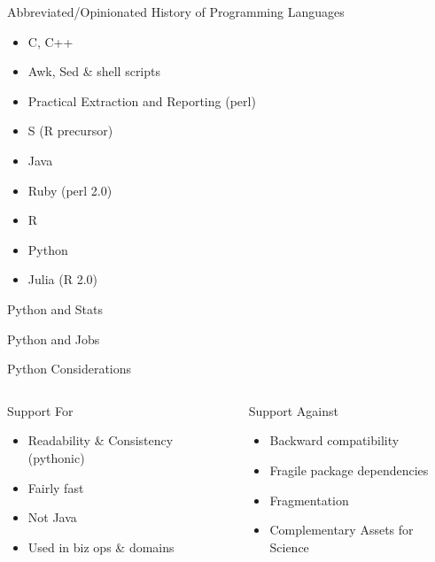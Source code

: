 \documentclass[presentation]{beamer}
\begin{document}
\begin{frame}[label=sec-2-0-1]{Abbreviated/Opinionated History of Programming Languages}
\begin{itemize}
\item C, C++
\item Awk, Sed \& shell scripts
\item Practical Extraction and Reporting (perl)
\item S (R precursor)
\item Java
\item Ruby (perl 2.0)
\item R
\item Python
\item Julia (R 2.0)
\end{itemize}
\end{frame}

\begin{frame}[label=sec-2-0-2]{Python and Stats}
\end{frame}

\begin{frame}[label=sec-2-0-3]{Python and Jobs}
\end{frame}

\begin{frame}[label=sec-2-0-4]{Python Considerations}
\begin{columns}
\begin{column}{0.4\textwidth}
\begin{block}{Support For}
\begin{itemize}
\item Readability \& Consistency (pythonic)
\item Fairly fast
\item Not Java
\item Used in biz ops \& domains
\end{itemize}
\end{block}
\end{column}

\begin{column}{0.4\textwidth}
\begin{block}{Support Against}
\begin{itemize}
\item Backward compatibility
\item Fragile package dependencies
\item Fragmentation
\item Complementary Assets for Science
\end{itemize}
\end{block}
\end{column}
\end{columns}
\end{frame}
\end{document}
